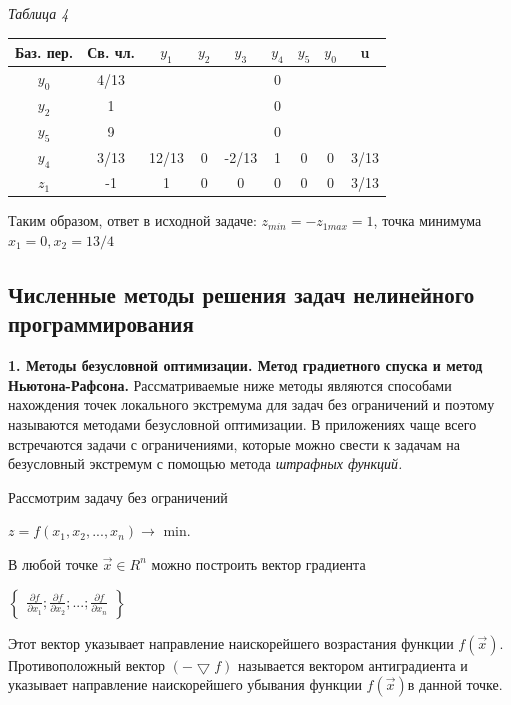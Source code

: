 {\begin{flushright}
	\textit{Таблица 4}
\end{flushright}
\begin{center}
	\begin{tabular}{|c|c|c|c|c|c|c|c|c|}
		\hline
		Баз. пер. & Св. чл. & $y_{1}$ & $y_{2}$ & $y_{3}$ & $y_{4}$ & $y_{5}$ & $y_{0}$ & u  \\
		\hline
		$y_{0}$ &4/13& & & &0& & &  \\
		\hline
		$y_{2}$&1& & & &0& & &\\
		\hline
		$y_{5}$&9& & & &0& & &\\
		\hline
		$y_{4}$&3/13&12/13&0&-2/13&1&0&0&3/13\\
		\hline
		$z_{1}$&-1&1&0&0&0&0&0&3/13\\
		\hline
	\end{tabular}
\end{center}

Таким образом, ответ в исходной задаче: $z_{min} = -z_{1max} = 1$, точка минимума $x_{1} = 0, x_{2} = 13/4$

\subsection{Численные методы решения задач нелинейного программирования}

\textbf{1. Методы безусловной оптимизации. Метод градиетного спуска и метод Ньютона-Рафсона.} Рассматриваемые ниже методы являются способами нахождения точек локального экстремума для задач без ограничений и поэтому называются методами безусловной оптимизации. В приложениях чаще всего встречаются задачи с ограничениями, которые можно свести к задачам на безусловный экстремум с помощью метода \textit{штрафных функций.}

Рассмотрим задачу без ограничений
\begin{center}
	$z=f(x_{1}, x_{2}, ..., x_{n})\rightarrow$ min.
\end{center}

В любой точке $\vec{x}\in R^{n}$ можно построить вектор градиента
\begin{center}
	$\begin{Bmatrix}
	\frac{\partial f}{\partial x_{1} };
	\frac{\partial f}{\partial x_{2} };...; \frac{\partial f}{\partial x_{n} }
	\end{Bmatrix}$
\end{center}

Этот вектор указывает направление наискорейшего возрастания функции $f(\vec{x})$. Противоположный вектор $(-\bigtriangledown f)$ называется вектором антиградиента и указывает направление наискорейшего убывания функции $f(\vec{x})$в данной точке.

}
